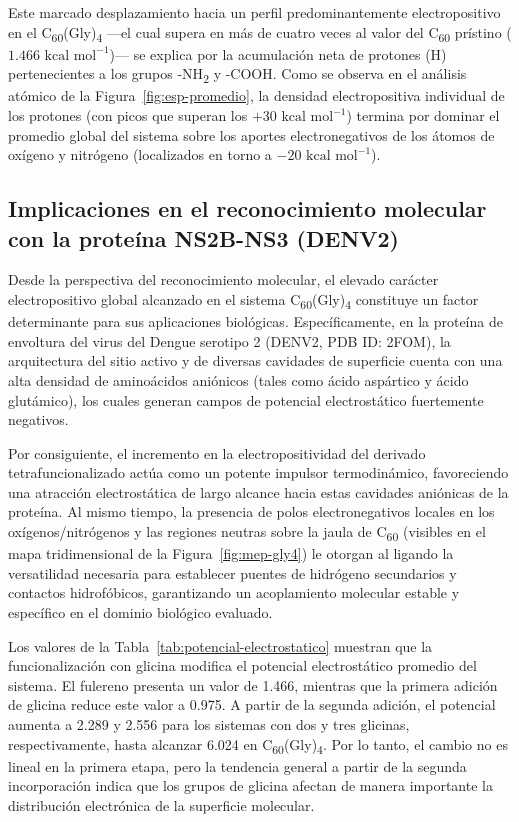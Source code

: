 Este marcado desplazamiento hacia un perfil predominantemente electropositivo en el C\textsubscript{60}(Gly)\textsubscript{4} —el cual supera en más de cuatro veces al valor del C\textsubscript{60} prístino ($1.466\text{ kcal mol}^{-1}$)— se explica por la acumulación neta de protones (H) pertenecientes a los grupos -NH\textsubscript{2} y -COOH. Como se observa en el análisis atómico de la Figura~\ref{fig:esp-promedio}, la densidad electropositiva individual de los protones (con picos que superan los $+30\text{ kcal mol}^{-1}$) termina por dominar el promedio global del sistema sobre los aportes electronegativos de los átomos de oxígeno y nitrógeno (localizados en torno a $-20\text{ kcal mol}^{-1}$).

\subsection{Implicaciones en el reconocimiento molecular con la proteína NS2B-NS3 (DENV2)}

Desde la perspectiva del reconocimiento molecular, el elevado carácter electropositivo global alcanzado en el sistema C\textsubscript{60}(Gly)\textsubscript{4} constituye un factor determinante para sus aplicaciones biológicas. Específicamente, en la proteína de envoltura del virus del Dengue serotipo 2 (DENV2, PDB ID: 2FOM), la arquitectura del sitio activo y de diversas cavidades de superficie cuenta con una alta densidad de aminoácidos aniónicos (tales como ácido aspártico y ácido glutámico), los cuales generan campos de potencial electrostático fuertemente negativos.

Por consiguiente, el incremento en la electropositividad del derivado tetrafuncionalizado actúa como un potente impulsor termodinámico, favoreciendo una atracción electrostática de largo alcance hacia estas cavidades aniónicas de la proteína. Al mismo tiempo, la presencia de polos electronegativos locales en los oxígenos/nitrógenos y las regiones neutras sobre la jaula de C\textsubscript{60} (visibles en el mapa tridimensional de la Figura~\ref{fig:mep-gly4}) le otorgan al ligando la versatilidad necesaria para establecer puentes de hidrógeno secundarios y contactos hidrofóbicos, garantizando un acoplamiento molecular estable y específico en el dominio biológico evaluado.


Los valores de la Tabla~\ref{tab:potencial-electrostatico} muestran que la funcionalización con glicina modifica el potencial electrostático promedio del sistema. El fulereno presenta un valor de 1.466, mientras que la primera adición de glicina reduce este valor a 0.975. A partir de la segunda adición, el potencial aumenta a 2.289 y 2.556 para los sistemas con dos y tres glicinas, respectivamente, hasta alcanzar 6.024 en C\textsubscript{60}(Gly)\textsubscript{4}. Por lo tanto, el cambio no es lineal en la primera etapa, pero la tendencia general a partir de la segunda incorporación indica que los grupos de glicina afectan de manera importante la distribución electrónica de la superficie molecular.

